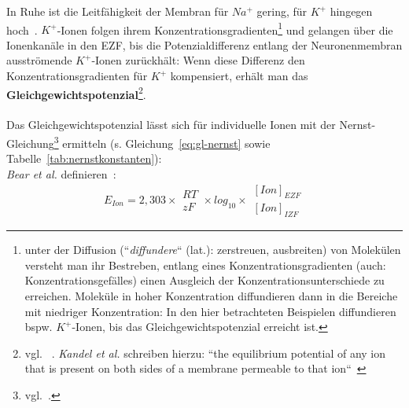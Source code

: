 {In Ruhe ist die Leitfähigkeit der Membran für $Na^+$ gering, für $K^+$ hingegen hoch~\cite[44]{SD07}.
$K^+$-Ionen folgen ihrem Konzentrationsgradienten\footnote{
 unter der Diffusion (``\textit{diffundere}`` (lat.): zerstreuen, ausbreiten) von Molekülen versteht man ihr Bestreben, entlang eines Konzentrationsgradienten (auch: Konzentrationsgefälles) einen Ausgleich der Konzentrationsunterschiede zu erreichen. Moleküle in hoher Konzentration diffundieren dann in die Bereiche mit niedriger Konzentration: In den hier betrachteten Beispielen diffundieren bspw. $K^+$-Ionen, bis das Gleichgewichtspotenzial erreicht ist.
} und gelangen über die Ionenkanäle in den EZF, bis die Potenzialdifferenz entlang der Neuronenmembran ausströmende $K^+$-Ionen zurückhält: Wenn diese Differenz den Konzentrationsgradienten für $K^+$ kompensiert, erhält man das \textbf{Gleichgewichtspotenzial}\footnote{
 vgl. ~\cite[72]{BCP18}. \textit{Kandel et al.} schreiben hierzu:
 ``the equilibrium potential of any ion that is present on both sides of a membrane permeable to that ion``~\cite[130]{KSJ+13}
}.\\

\noindent{}\\


Das Gleichgewichtspotenzial lässt sich für individuelle Ionen mit der Nernst-Gleichung\footnote{
 vgl.~\cite[67]{FE19}.
} ermitteln (s. Gleichung~\ref{eq:gl-nernst} sowie Tabelle~\ref{tab:nernstkonstanten}):\\

\textit{Bear et al.} definieren~\cite[74, Exkurs 3.2]{BCP18}:
\begin{equation}
E_{Ion} = 2,303  \times \begin{matrix} RT \\ \hline zF \end{matrix} \times log_{10} \times \begin{matrix} [Ion]_{EZF} \\ \hline [Ion]_{IZF} \end{matrix}
\label{eq:gl-nernst}
\end{equation}



}
